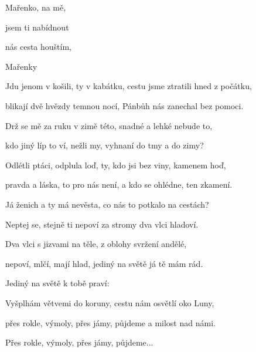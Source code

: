 

\zs
{} Mařenko,  na mě,

 jsem ti nabídnout 

 nás cesta  houštím,

 Mařenky 
\ks

\zs
Jdu jenom v košili, ty v kabátku, cestu jsme ztratili hned z počátku,

blikají dvě hvězdy temnou nocí, Pánbůh nás zanechal bez pomoci.
\ks

\zs
Drž se mě za ruku v zimě této, snadné a lehké nebude to,

kdo jiný líp to ví, nežli my, vyhnaní do tmy a do zimy?
\ks

\zs
Odlétli ptáci, odplula loď, ty, kdo jsi bez viny, kamenem hoď,

pravda a láska, to pro nás není, a kdo se ohlédne, ten zkamení.
\ks

\zs
Já ženich a ty má nevěsta, co nás to potkalo na cestách?

Neptej se, stejně ti nepoví za stromy dva vlci hladoví.
\ks

\zs
Dva vlci s jizvami na těle, z oblohy svržení andělé,

nepoví, mlčí, mají hlad, jediný na světě já tě mám rád.
\ks

\zs
Jediný na světě k tobě praví: 
\ks

\zs
Vyšplhám větvemi do koruny, cestu nám osvětlí oko Luny,

přes rokle, výmoly, přes jámy, půjdeme a milost nad námi.

Přes rokle, výmoly, přes jámy, půjdeme...

    
\ks

\kp

